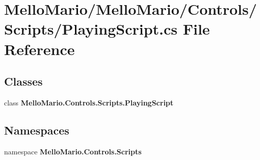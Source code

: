 \section{Mello\+Mario/\+Mello\+Mario/\+Controls/\+Scripts/\+Playing\+Script.cs File Reference}
\label{PlayingScript_8cs}
\subsection*{Classes}
\begin{DoxyCompactItemize}
\item 
class \textbf{ Mello\+Mario.\+Controls.\+Scripts.\+Playing\+Script}
\end{DoxyCompactItemize}
\subsection*{Namespaces}
\begin{DoxyCompactItemize}
\item 
namespace \textbf{ Mello\+Mario.\+Controls.\+Scripts}
\end{DoxyCompactItemize}
